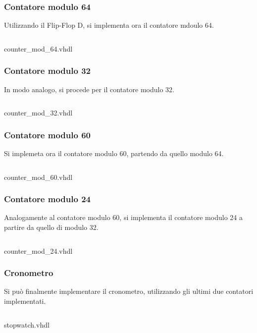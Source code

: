 \subsubsection{Contatore modulo 64}
Utilizzando il Flip-Flop D, si implementa ora il contatore mdoulo 64.
\begin{code}
    \inputminted[frame=lines, framesep=2mm, baselinestretch=1.2, bgcolor=LightGray, fontsize=\footnotesize, linenos]{vhdl}{vhdl_files/Esercizio_5.1/counter_mod_64.vhdl}
    \caption{counter\_mod\_64.vhdl}
    \label{lst:count_64}
\end{code}

\subsubsection{Contatore modulo 32}
In modo analogo, si procede per il contatore modulo 32.
\begin{code}
    \inputminted[frame=lines, framesep=2mm, baselinestretch=1.2, bgcolor=LightGray, fontsize=\footnotesize, linenos]{vhdl}{vhdl_files/Esercizio_5.1/counter_mod_32.vhdl}
    \caption{counter\_mod\_32.vhdl}
    \label{lst:count_32}
\end{code}

\subsubsection{Contatore modulo 60}
Si implemeta ora il contatore modulo 60, partendo da quello modulo 64.
\begin{code}
    \inputminted[frame=lines, framesep=2mm, baselinestretch=1.2, bgcolor=LightGray, fontsize=\footnotesize, linenos]{vhdl}{vhdl_files/Esercizio_5.1/counter_mod_60.vhdl}
    \caption{counter\_mod\_60.vhdl}
    \label{lst:count_60}
\end{code}

\subsubsection{Contatore modulo 24}
Analogamente al contatore modulo 60, si implementa il contatore modulo 24 a partire da quello di modulo 32.
\begin{code}
    \inputminted[frame=lines, framesep=2mm, baselinestretch=1.2, bgcolor=LightGray, fontsize=\footnotesize, linenos]{vhdl}{vhdl_files/Esercizio_5.1/counter_mod_24.vhdl}
    \caption{counter\_mod\_24.vhdl}
    \label{lst:count_24}
\end{code}

\subsubsection{Cronometro}
Si può finalmente implementare il cronometro, utilizzando gli ultimi due contatori implementati.
\begin{code}
    \inputminted[frame=lines, framesep=2mm, baselinestretch=1.2, bgcolor=LightGray, fontsize=\footnotesize, linenos]{vhdl}{vhdl_files/Esercizio_5.1/stopwatch.vhdl}
    \caption{stopwatch.vhdl}
    \label{lst:stopwatch}
\end{code}

